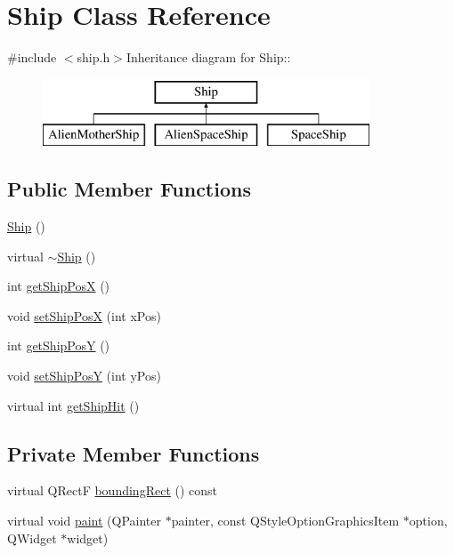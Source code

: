 \hypertarget{class_ship}{
\section{Ship Class Reference}
\label{class_ship}
}


{\ttfamily \#include $<$ship.h$>$}Inheritance diagram for Ship::\begin{figure}[H]
\begin{center}
\leavevmode
\includegraphics[height=2cm]{class_ship}
\end{center}
\end{figure}
\subsection*{Public Member Functions}
\begin{DoxyCompactItemize}
\item 
\hyperlink{class_ship_ab7608fcfc4d27c678aacaf9bfd68a462}{Ship} ()
\item 
virtual \hyperlink{class_ship_a43cd6eeaffc11b49239b091621963a65}{$\sim$Ship} ()
\item 
int \hyperlink{class_ship_a32927e82496a210417b18e0910748878}{getShipPosX} ()
\item 
void \hyperlink{class_ship_a04c11ab00c916c3a1b32f5ad468f867b}{setShipPosX} (int xPos)
\item 
int \hyperlink{class_ship_a554008262afb114d9360a8d80fd9c2c9}{getShipPosY} ()
\item 
void \hyperlink{class_ship_add87a9ada3b93bce7b5962e1192b496c}{setShipPosY} (int yPos)
\item 
virtual int \hyperlink{class_ship_ab8efcfc8f38e0b231b99585846e676c5}{getShipHit} ()
\end{DoxyCompactItemize}
\subsection*{Private Member Functions}
\begin{DoxyCompactItemize}
\item 
virtual QRectF \hyperlink{class_ship_a40856df827844b4045eb97345f401995}{boundingRect} () const 
\item 
virtual void \hyperlink{class_ship_a1dad980a3b84bb77c63da853ec13477d}{paint} (QPainter $\ast$painter, const QStyleOptionGraphicsItem $\ast$option, QWidget $\ast$widget)
\end{DoxyCompactItemize}
